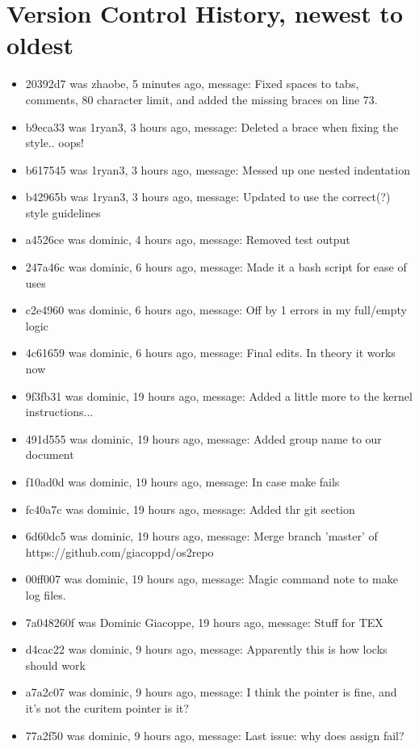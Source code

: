 \documentclass[IEEEtran,letterpaper,10pt,notitlepage,draftclsnofoot,onecolumn]{article}
\begin{document}
\section{Version Control History, newest to oldest}
\begin{itemize}
\item 20392d7 was zhaobe, 5 minutes ago, message: Fixed spaces to tabs, comments, 80 character limit, and added the missing braces on line 73.
\item b9eca33 was 1ryan3, 3 hours ago, message: Deleted a brace when fixing the style.. oops!
\item b617545 was 1ryan3, 3 hours ago, message: Messed up one nested indentation
\item b42965b was 1ryan3, 3 hours ago, message: Updated to use the correct(?) style guidelines
\item a4526ce was dominic, 4 hours ago, message: Removed test output
\item 247a46c was dominic, 6 hours ago, message: Made it a bash script for ease of uses
\item c2e4960 was dominic, 6 hours ago, message: Off by 1 errors in my full/empty logic
\item 4c61659 was dominic, 6 hours ago, message: Final edits. In theory it works now
\item 9f3fb31 was dominic, 19 hours ago, message: Added a little more to the kernel instructions...
\item 491d555 was dominic, 19 hours ago, message: Added group name to our document
\item f10ad0d was dominic, 19 hours ago, message: In case make fails
\item fc40a7c was dominic, 19 hours ago, message: Added thr git section
\item 6d60dc5 was dominic, 19 hours ago, message: Merge branch 'master' of https://github.com/giacoppd/os2repo
\item 00ff007 was dominic, 19 hours ago, message: Magic command note to make log files.
\item 7a048260f was Dominic Giacoppe, 19 hours ago, message: Stuff for TEX
\item d4cac22 was dominic, 9 hours ago, message: Apparently this is how locks should work
\item a7a2c07 was dominic, 9 hours ago, message: I think the pointer is fine, and it's not the curitem pointer is it?
\item 77a2f50 was dominic, 9 hours ago, message: Last issue: why does assign fail?

\end{itemize}
\end{document}
